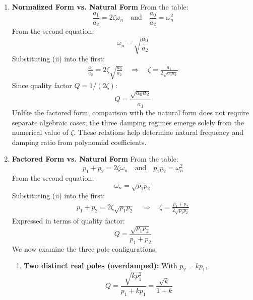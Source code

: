\begin{enumerate}
\begin{enumerate}
\begin{align*}
          \frac{a_0}{a_2} &= \alpha^2 + \beta^2 \quad \Rightarrow \quad \alpha^2 + \beta^2 = \frac{a_0}{a_2} \tag{ii}
        \end{align*}
        Substituting (i) into (ii):
        \begin{align*}
          \left( \frac{a_1}{2a_2} \right)^2 + \beta^2 = \frac{a_0}{a_2}
          \quad \Rightarrow \quad
          \boxed{\beta = \sqrt{\frac{a_0}{a_2} - \frac{a_1^2}{4a_2^2}}}
        \end{align*}
    \end{enumerate}
    These relations help determine pole locations from
    polynomial coefficients and help in pole placement
    design (chose k to set pole separation).
  \item \textbf{Normalized Form vs. Natural Form}
    \noindent From the table:
    \[ \frac{a_1}{a_2} = 2\zeta\omega_n \quad \text{and} \quad \frac{a_0}{a_2} = \omega_n^2 \]
    From the second equation:
    \[ \omega_n = \sqrt{\frac{a_0}{a_2}} \tag{ii} \]
    Substituting (ii) into the first:
    \begin{align*}
    \frac{a_1}{a_2} = 2\zeta \sqrt{\frac{a_0}{a_2}}
    \quad \Rightarrow \quad
    \zeta = \frac{a_1}{2\sqrt{a_0 a_2}}
    \end{align*}
    Since quality factor \( Q = 1/(2\zeta) \):
    \[ \boxed{Q = \frac{\sqrt{a_0 a_2}}{a_1}} \]
    Unlike the factored form, comparison with the natural form does
    not require separate algebraic cases; the three damping regimes
    emerge solely from the numerical value of \(\zeta\). These
    relations help determine natural frequency and damping ratio from
    polynomial coefficients.
  \item \textbf{Factored Form vs. Natural Form}
    \noindent From the table:
    \[ p_1 + p_2 = 2\zeta\omega_n \quad \text{and} \quad p_1 p_2 = \omega_n^2 \]
    From the second equation:
    \[ \omega_n = \sqrt{p_1 p_2} \tag{ii} \]
    Substituting (ii) into the first:
    \begin{align*}
      p_1 + p_2 = 2\zeta \sqrt{p_1 p_2}
      \quad \Rightarrow \quad
      \zeta = \frac{p_1 + p_2}{2\sqrt{p_1 p_2}}
    \end{align*}
    Expressed in terms of quality factor:
    \[ \boxed{Q = \frac{\sqrt{p_1 p_2}}{p_1 + p_2}}\]
    We now examine the three pole configurations:
    \begin{enumerate}
      \item \textbf{Two distinct real poles (overdamped):} With \( p_2 = k p_1 \),
        \[ Q = \frac{\sqrt{k p_1^2}}{p_1 + k p_1} = \frac{\sqrt{k}}{1+k} \]

\end{enumerate}
\end{enumerate}
